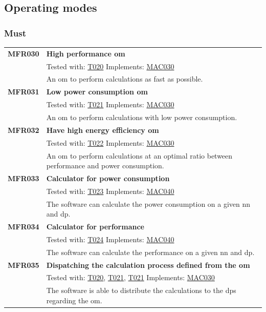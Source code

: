 \documentclass[parskip=full]{scrartcl}
\begin{document}
\subsection{Operating modes}
\subsubsection{Must}
\begin{tabular}{p{2cm}p{11.4cm}}
\textbf{MFR030} \hypertarget{MFR020} & \textbf{High \gls{performance} \gls{om}}\\         
& Tested with: \hyperlink{T020}{T020} Implements: \hyperlink{MAC030}{MAC030} \\                           
& An \gls{om} to perform calculations as fast as possible.\\
\textbf{MFR031} \hypertarget{MFR021}& \textbf{Low \gls{power consumption} \gls{om}}\\ 
& Tested with: \hyperlink{T021}{T021} Implements: \hyperlink{MAC030}{MAC030} \\                                   
& An \gls{om} to perform calculations with low \gls{power consumption}.\\
\textbf{MFR032} \hypertarget{MFR022}& \textbf{Have high energy efficiency \gls{om}}\\      
& Tested with: \hyperlink{T022}{T022}  Implements: \hyperlink{MAC030}{MAC030} \\                              
& An \gls{om} to perform calculations at an optimal ratio between \gls{performance} and \gls{power consumption}.\\
\textbf{MFR033}\hypertarget{MFR023} & \textbf{Calculator for \gls{power consumption}}\\ & Tested with: \hyperlink{T023}{T023} Implements:  \hyperlink{MAC040}{MAC040} \\                                   
& The software can calculate the \gls{power consumption} on a given \gls{nn} and \gls{dp}.\\
\textbf{MFR034}\hypertarget{MFR024} & \textbf{Calculator for \gls{performance}}\\
& Tested with: \hyperlink{T024}{T024} Implements: \hyperlink{MAC040}{MAC040} \\                                    
& The software can calculate the \gls{performance} on a given \gls{nn} and \gls{dp}.\\
\textbf {MFR035} \hypertarget{MFR025}& \textbf{Dispatching the calculation process defined from the \gls{om}}\\
& Tested with: \hyperlink{T020}{T020}, \hyperlink{T021}{T021}, \hyperlink{T021}{T021} Implements: \hyperlink{MAC030}{MAC030}\\
& The software is able to distribute the calculations to the \glspl{dp} regarding the \gls{om}. \\
\end{tabular}
\end{document}
